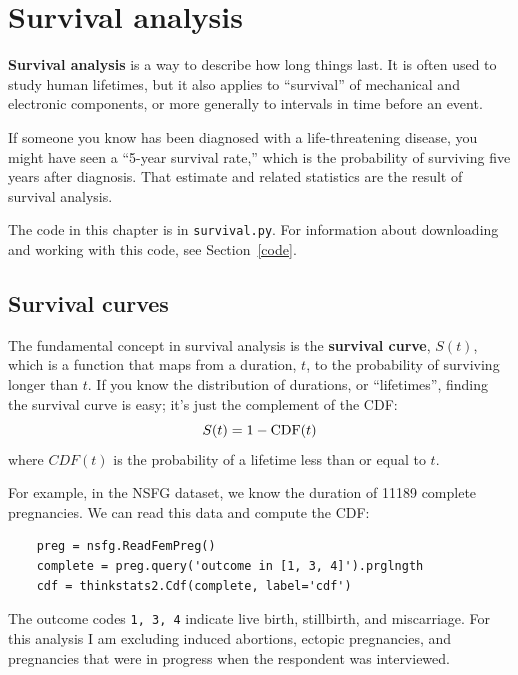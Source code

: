 \documentclass[12pt]{book}
\begin{document}
\chapter{Survival analysis}

{\bf Survival analysis} is a way to describe how long things last.
It is often used to study human lifetimes, but it
also applies to ``survival'' of mechanical and electronic components, or
more generally to intervals in time before an event.

If someone you know has been diagnosed with a life-threatening
disease, you might have seen a ``5-year survival rate,'' which
is the probability of surviving five years after diagnosis.  That
estimate and related statistics are the result of survival analysis.

The code in this chapter is in {\tt survival.py}.  For information
about downloading and working with this code, see Section~\ref{code}.


\section{Survival curves}
\label{survival}

The fundamental concept in survival analysis is the {\bf survival
  curve}, $S(t)$, which is a function that maps from a duration, $t$, to the
probability of surviving longer than $t$.  If you know the distribution
of durations, or ``lifetimes'', finding the survival curve is easy;
it's just the complement of the CDF: 
%
\[ S(t) = 1 - \mathrm{CDF}(t) \]
%
where $CDF(t)$ is the probability of a lifetime less than or equal
to $t$.
  

For example, in the NSFG dataset, we know the duration of 11189
complete pregnancies.  We can read this data and compute the CDF:

\begin{verbatim}
    preg = nsfg.ReadFemPreg()
    complete = preg.query('outcome in [1, 3, 4]').prglngth
    cdf = thinkstats2.Cdf(complete, label='cdf')
\end{verbatim}

The outcome codes {\tt 1, 3, 4} indicate live birth, stillbirth,
and miscarriage.  For this analysis I am excluding induced abortions,
ectopic pregnancies, and pregnancies that were in progress when
the respondent was interviewed.
\end{document}
